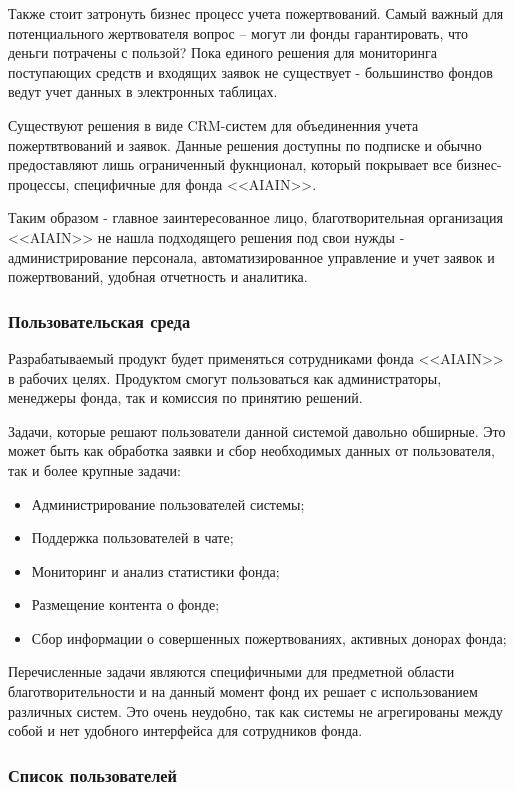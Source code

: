 \documentclass[a4paper,12pt,reqno]{article}
\begin{document}
Также стоит затронуть бизнес процесс учета пожертвований. Самый важный для потенциального жертвователя вопрос – могут ли фонды гарантировать, что деньги потрачены с пользой? Пока единого решения для мониторинга поступающих средств и входящих заявок не существует - большинство фондов ведут учет данных в электронных таблицах. 

Существуют решения в виде CRM-систем для объединенния учета пожертвтвований и заявок. Данные решения доступны по подписке и обычно предоставляют лишь ограниченный фукнционал, который покрывает все бизнес-процессы, специфичные для фонда <<AIAIN>>. 

Таким образом - главное заинтересованное лицо, благотворительная организация <<AIAIN>> не нашла подходящего решения под свои нужды - администрирование персонала, автоматизированное управление и учет заявок и пожертвований, удобная отчетность и аналитика.

\subsubsection{Пользовательская среда}

Разрабатываемый продукт будет применяться сотрудниками фонда <<AIAIN>> в рабочих целях. Продуктом смогут пользоваться как администраторы, менеджеры фонда, так и комиссия по принятию решений. 

Задачи, которые решают пользователи данной системой давольно обширные. Это может быть как обработка заявки и сбор необходимых данных от пользователя, так и более крупные задачи:

\begin{itemize}
    \item Администрирование пользователей системы;
    \item Поддержка пользователей в чате;
    \item Мониторинг и анализ статистики фонда;
    \item Размещение контента о фонде;
    \item Сбор информации о совершенных пожертвованиях, активных донорах фонда; 
\end{itemize}

Перечисленные задачи являются специфичными для предметной области благотворительности и на данный момент фонд их решает с использованием различных систем. Это очень неудобно, так как системы не агрегированы между собой и нет удобного интерфейса для сотрудников фонда.

\subsubsection{Список пользователей} \label{sec: listusers}
\end{document}
